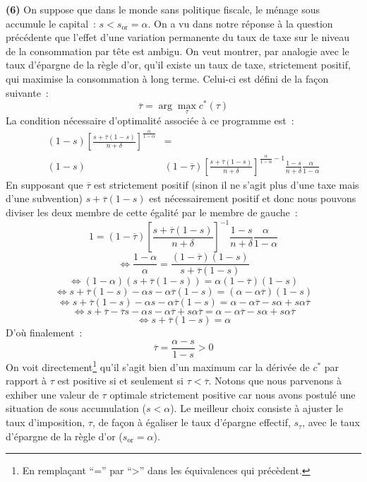 \documentclass[10pt,a4paper,notitlepage,onecolumn]{article}
\newcommand{\question}[1]{\textbf{(#1)}}
\begin{document}
\question{6} On suppose que dans le monde sans politique fiscale, le ménage sous accumule le capital~:
$s<s_{\mathrm{or}}=\alpha$. On  a vu dans notre réponse  à la question
précédente que l'effet d'une variation  permanente du taux de taxe sur
le niveau de la consommation par tête est ambigu. On veut montrer, par
analogie avec le taux d'épargne de la règle d'or, qu'il existe un taux
de  taxe, strictement  positif, qui  maximise la  consommation  à long
terme. Celui-ci est défini de la façon suivante~:
\[
\overline{\tau} = \arg\max_{\tau} c^{\ast}(\tau)
\]
La condition nécessaire d'optimalité associée à ce programme est~:
\[
\begin{split}
(1-s)\left[\frac{s +
\overline{\tau}(1-s)}{n+\delta}\right]^{\frac{\alpha}{1-\alpha}} &=\\
(1-s)&(1-\overline{\tau})\left[\frac{s +
\overline{\tau}(1-s)}{n+\delta}\right]^{\frac{\alpha}{1-\alpha}-1}\frac{1-s}{n+\delta}\frac{\alpha}{1-\alpha}
\end{split}
\]
En supposant que $\overline{\tau}$ est strictement positif (sinon il
ne s'agit plus d'une taxe mais d'une subvention)
$s+\overline{\tau}(1-s)$ est nécessairement positif et donc nous
pouvons diviser les deux membre de cette égalité par le membre de
gauche~:
\[
 1 = (1-\overline{\tau})\left[\frac{s +
\overline{\tau}(1-s)}{n+\delta}\right]^{-1}\frac{1-s}{n+\delta}\frac{\alpha}{1-\alpha}
\]
\[
\Leftrightarrow \frac{1-\alpha}{\alpha} =
\frac{(1-\overline{\tau})(1-s)}{s + \overline{\tau}(1-s)}
\]
\[
\Leftrightarrow (1-\alpha)(s + \overline{\tau}(1-s)) =
\alpha(1-\overline{\tau})(1-s)
\]
\[
\Leftrightarrow s + \overline{\tau}(1-s) - \alpha s - \alpha
\overline{\tau}(1-s) = (\alpha-\alpha\overline{\tau})(1-s)
\]
\[
\Leftrightarrow s + \overline{\tau}(1-s) - \alpha s - \alpha
\overline{\tau}(1-s) = \alpha-\alpha\overline{\tau}-s\alpha +
s\alpha\overline{\tau}
\]
\[
\Leftrightarrow s + \overline{\tau}-\overline{\tau}s - \alpha s -
\alpha \overline{\tau}+s\alpha \overline{\tau} =
\alpha-\alpha\overline{\tau}-s\alpha + s\alpha\overline{\tau}
\]
\[
\Leftrightarrow s + \overline{\tau}(1-s)  = \alpha
\]
D'où finalement~:
\[
\overline{\tau} = \frac{\alpha-s}{1-s}>0
\]
On voit directement\footnote{En remplaçant ``='' par ``>'' dans les
équivalences qui précèdent.} qu'il s'agit bien d'un maximum car la
dérivée de $c^{\ast}$ par rapport à $\tau$ est positive si et
seulement si $\tau<\overline{\tau}$. Notons que nous parvenons à
exhiber une valeur de $\tau$ optimale strictement positive car nous
avons postulé une situation de sous accumulation ($s<\alpha$). Le
meilleur choix consiste à ajuster le taux d'imposition, $\tau$, de
façon à égaliser le taux d'épargne effectif, $s_{\tau}$, avec le
taux d'épargne de la règle d'or ($s_{\mathrm{or}}=\alpha$).\newline 
\end{document}
